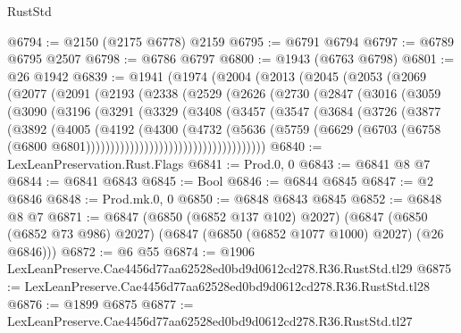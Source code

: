 \begin{lexlean}{RustStd}
\begin{coremodule}
@6794 := @2150 (@2175 @6778) @2159
@6795 := @6791 @6794
@6797 := @6789 @6795 @2507
@6798 := @6786 @6797
@6800 := @1943 (@6763 @6798)
@6801 := @26 @1942
@6839 := @1941
    (@1974
      (@2004
        (@2013
          (@2045
            (@2053
              (@2069
                (@2077
                  (@2091
                    (@2193
                      (@2338
                        (@2529
                          (@2626
                            (@2730
                              (@2847
                                (@3016
                                  (@3059
                                    (@3090
                                      (@3196
                                        (@3291
                                          (@3329
                                            (@3408
                                              (@3457
                                                (@3547
                                                  (@3684
                                                    (@3726
                                                      (@3877
                                                        (@3892
                                                          (@4005
                                                            (@4192
                                                              (@4300
                                                                (@4732
                                                                  (@5636
                                                                    (@5759
                                                                      (@6629
                                                                        (@6703
                                                                          (@6758
                                                                            (@6800
                                                                              @6801)))))))))))))))))))))))))))))))))))))
@6840 := LexLeanPreservation.Rust.Flags
@6841 := Prod.{0, 0}
@6843 := @6841 @8 @7
@6844 := @6841 @6843
@6845 := Bool
@6846 := @6844 @6845
@6847 := @2 @6846
@6848 := Prod.mk.{0, 0}
@6850 := @6848 @6843 @6845
@6852 := @6848 @8 @7
@6871 := @6847
    (@6850 (@6852 @137 @102) @2027)
    (@6847 (@6850 (@6852 @73 @986) @2027) (@6847 (@6850 (@6852 @1077 @1000) @2027) (@26 @6846)))
@6872 := @6 @55
@6874 := @1906 LexLeanPreserve.Cae4456d77aa62528ed0bd9d0612cd278.R36.RustStd.tl29
@6875 := LexLeanPreserve.Cae4456d77aa62528ed0bd9d0612cd278.R36.RustStd.tl28
@6876 := @1899 @6875
@6877 := LexLeanPreserve.Cae4456d77aa62528ed0bd9d0612cd278.R36.RustStd.tl27

\end{coremodule}
\end{lexlean}
